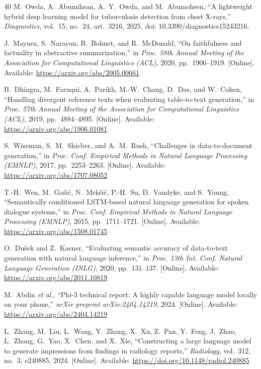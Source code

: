 \documentclass[conference, letterpaper]{IEEEtran}
\begin{document}
\begin{thebibliography}{40}
M.~Owda, A.~Abumihsan, A.~Y.~Owda, and M.~Abumohsen, ``A lightweight hybrid deep learning model for tuberculosis detection from chest X-rays,'' \textit{Diagnostics}, vol.~15, no.~24, art.~3216, 2025, doi: 10.3390/diagnostics15243216.

J.~Maynez, S.~Narayan, B.~Bohnet, and R.~McDonald, ``On faithfulness and factuality in abstractive summarization,'' in \textit{Proc. 58th Annual Meeting of the Association for Computational Linguistics (ACL)}, 2020, pp.~1906--1919. [Online]. Available: \url{https://arxiv.org/abs/2005.00661}

B.~Dhingra, M.~Faruqui, A.~Parikh, M.-W.~Chang, D.~Das, and W.~Cohen, ``Handling divergent reference texts when evaluating table-to-text generation,'' in \textit{Proc. 57th Annual Meeting of the Association for Computational Linguistics (ACL)}, 2019, pp.~4884--4895. [Online]. Available: \url{https://arxiv.org/abs/1906.01081}

S.~Wiseman, S.~M.~Shieber, and A.~M.~Rush, ``Challenges in data-to-document generation,'' in \textit{Proc. Conf. Empirical Methods in Natural Language Processing (EMNLP)}, 2017, pp.~2253--2263. [Online]. Available: \url{https://arxiv.org/abs/1707.08052}

T.-H.~Wen, M.~Ga\v{s}i\'{c}, N.~Mrk\v{s}i\'{c}, P.-H.~Su, D.~Vandyke, and S.~Young, ``Semantically conditioned LSTM-based natural language generation for spoken dialogue systems,'' in \textit{Proc. Conf. Empirical Methods in Natural Language Processing (EMNLP)}, 2015, pp.~1711--1721. [Online]. Available: \url{https://arxiv.org/abs/1508.01745}

O.~Du\v{s}ek and Z.~Kasner, ``Evaluating semantic accuracy of data-to-text generation with natural language inference,'' in \textit{Proc. 13th Int. Conf. Natural Language Generation (INLG)}, 2020, pp.~131--137. [Online]. Available: \url{https://arxiv.org/abs/2011.10819}

M.~Abdin \textit{et al.}, ``Phi-3 technical report: A highly capable language model locally on your phone,'' \textit{arXiv preprint arXiv:2404.14219}, 2024. [Online]. Available: \url{https://arxiv.org/abs/2404.14219}

L.~Zhang, M.~Liu, L.~Wang, Y.~Zhang, X.~Xu, Z.~Pan, Y.~Feng, J.~Zhao, L.~Zhang, G.~Yao, X.~Chen, and X.~Xie, ``Constructing a large language model to generate impressions from findings in radiology reports,'' \textit{Radiology}, vol.~312, no.~3, e240885, 2024. [Online]. Available: \url{https://doi.org/10.1148/radiol.240885}


\end{thebibliography}
\end{document}
